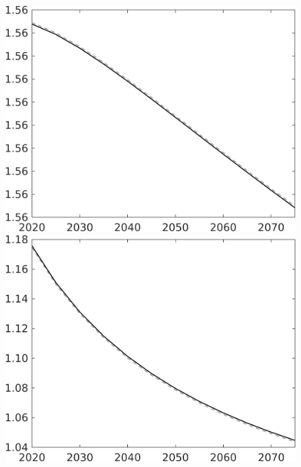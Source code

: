 \documentclass[12pt]{article}
\begin{document}
\begin{figure}[h!!]
\begin{minipage}[]{0.32\textwidth}
	\end{minipage}	
	\begin{minipage}[]{0.32\textwidth}
		\includegraphics[width=1\textwidth]{../../codding_model/own_basedOnFried/optimalPol_010922_revision/figures/all_13Sept22/CompTaul_LFBAU_Reg0_pn_spillover0_nsk0_xgr0_knspil0_sep1_countec0_GovRev0_etaa0.79_lgd0.png}
	\end{minipage}	
	\begin{minipage}[]{0.32\textwidth}
		\includegraphics[width=1\textwidth]{../../codding_model/own_basedOnFried/optimalPol_010922_revision/figures/all_13Sept22/CompTaul_LFBAU_Reg0_pg_spillover0_nsk0_xgr0_knspil0_sep1_countec0_GovRev0_etaa0.79_lgd0.png}

\end{minipage}
\end{figure}
\end{document}
